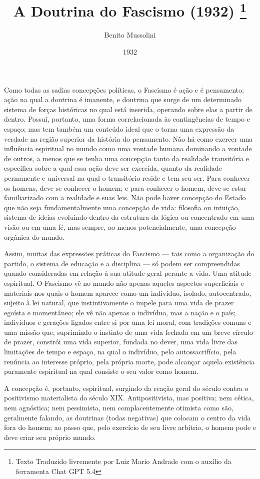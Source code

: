 \documentclass[12pt]{article}
\title{A Doutrina do Fascismo (1932) \thanks{Texto Traduzido livremente por Luiz Mario Andrade com o auxílio da ferramenta Chat GPT 5.4}}
\author{Benito Mussolini}
\date{1932}
\begin{document}
\maketitle

Como todas as sadias concepções políticas, o Fascismo é ação e é pensamento; ação na qual a doutrina é imanente, e doutrina que surge de um determinado sistema de forças históricas no qual está inserida, operando sobre elas a partir de dentro. Possui, portanto, uma forma correlacionada às contingências de tempo e espaço; mas tem também um conteúdo ideal que o torna uma expressão da verdade na região superior da história do pensamento. Não há como exercer uma influência espiritual no mundo como uma vontade humana dominando a vontade de outros, a menos que se tenha uma concepção tanto da realidade transitória e específica sobre a qual essa ação deve ser exercida, quanto da realidade permanente e universal na qual o transitório reside e tem seu ser. Para conhecer os homens, deve-se conhecer o homem; e para conhecer o homem, deve-se estar familiarizado com a realidade e suas leis. Não pode haver concepção do Estado que não seja fundamentalmente uma concepção de vida: filosofia ou intuição, sistema de ideias evoluindo dentro da estrutura da lógica ou concentrado em uma visão ou em uma fé, mas sempre, ao menos potencialmente, uma concepção orgânica do mundo.

Assim, muitas das expressões práticas do Fascismo — tais como a organização do partido, o sistema de educação e a disciplina — só podem ser compreendidas quando consideradas em relação à sua atitude geral perante a vida. Uma atitude espiritual. O Fascismo vê no mundo não apenas aqueles aspectos superficiais e materiais nos quais o homem aparece como um indivíduo, isolado, autocentrado, sujeito à lei natural, que instintivamente o impele para uma vida de prazer egoísta e momentâneo; ele vê não apenas o indivíduo, mas a nação e o país; indivíduos e gerações ligados entre si por uma lei moral, com tradições comuns e uma missão que, suprimindo o instinto de uma vida fechada em um breve círculo de prazer, constrói uma vida superior, fundada no dever, uma vida livre das limitações de tempo e espaço, na qual o indivíduo, pelo autossacrifício, pela renúncia ao interesse próprio, pela própria morte, pode alcançar aquela existência puramente espiritual na qual consiste o seu valor como homem.

A concepção é, portanto, espiritual, surgindo da reação geral do século contra o positivismo materialista do século XIX. Antipositivista, mas positiva; nem cética, nem agnóstica; nem pessimista, nem complacentemente otimista como são, geralmente falando, as doutrinas (todas negativas) que colocam o centro da vida fora do homem; ao passo que, pelo exercício de seu livre arbítrio, o homem pode e deve criar seu próprio mundo.
\end{document}
